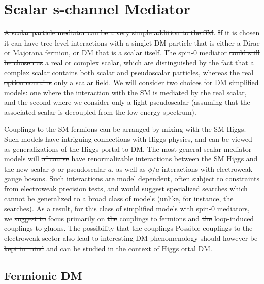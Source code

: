 \section{Scalar s-channel Mediator}
\label{sec:scalar}
 
\sout{A scalar particle mediator can be a very simple addition to the SM}.  {\sout If it is chosen}  it can have tree-level interactions with a singlet DM particle that is either a Dirac or Majorana fermion, or DM that  is a scalar itself. The spin-$0$ mediator \sout{could  still be chosen as}  a real or complex scalar, which are distinguished by the fact that a complex scalar contains both scalar and pseudoscalar particles, whereas the real \sout{option contains}  only a scalar field. We will consider two choices for DM simplified models: one where the interaction with the SM is mediated by the real scalar, and the second where we consider only a light pseudoscalar (assuming that the associated scalar is decoupled from the low-energy spectrum). 
 
Couplings to the SM fermions can be arranged by mixing with the SM Higgs.  Such models have intriguing connections with Higgs physics, and can be viewed as generalizations of the Higgs portal to DM. The most general scalar mediator models will \sout{of course} have renormalizable interactions between the SM Higgs and the new scalar $\phi$ or pseudoscalar $a$, as well as $\phi/a$ interactions with electroweak gauge bosons. Such interactions are model dependent, often subject to constraints from electroweak precision tests, and would suggest specialized searches which cannot be generalized to a broad class of models (unlike, for instance, the  searches). As a result, for this class of  simplified models with spin-$0$ mediators, we \sout{suggest to}  focus primarily on \sout{the} couplings to fermions and \sout{the} loop-induced couplings to gluons. \sout{The possibility that the couplings} Possible couplings to the electroweak sector  also lead to interesting DM phenomenology \sout{should however be kept in mind}  and can be studied in the context of Higgs ortal DM.

\subsection{Fermionic DM}


